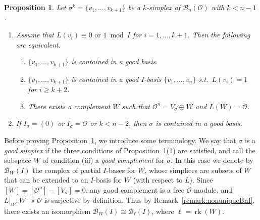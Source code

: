\documentclass[11 pt]{article}
\theoremstyle{plain}
\newtheorem{proposition}[theorem]{Proposition}
\theoremstyle{definition}
\numberwithin{equation}{section}
\renewcommand{\O}{\mathcal{O}}
\newcommand\PartialBases{\ensuremath{\mathcal{B}}}
\newcommand{\PB}{\PartialBases}
\newcommand\onto{\twoheadrightarrow}
\DeclareMathOperator{\Rank}{rk}
\newcommand\iso{\cong}
\newcommand{\change}{}
\begin{document}
\begin{proposition}
\label{prop:charBprime}
Let $\sigma^k=\{v_1,\ldots,v_{k+1}\}$ be a $k$-simplex of $\PB_n(\O)$ \change with $k<n-1$.
\begin{enumerate}[label={\normalfont (\arabic*)},topsep=2pt,itemsep=2pt,parsep=2pt]
\item Assume that \change $L(v_i)\equiv 0\text{ or }1\bmod{I}$ for $i=1,\ldots,k+1$.  Then the following are equivalent.
\begin{enumerate}[label={\normalfont (\roman*)},topsep=1pt,noitemsep]
\item $\{v_1,\ldots,v_{k+1}\}$ is contained in a good basis.
\item $\{v_1,\ldots,v_{k+1}\}$ is contained in a good $I$-basis $\{v_1,\ldots,v_n\}$ s.t.\ $L(v_i)=1$ for $i\geq k+2$.
\item There exists a complement $W$ such that $\O^n=V_\sigma\oplus W$ and $L(W)=\O$.
\end{enumerate}
\item If $I_\sigma=(0)$ or $I_\sigma=\O$ or $k<n-2$, then $\sigma$ is contained in a good basis.
\end{enumerate}
\end{proposition}

Before proving Proposition~\ref{prop:charBprime}, we introduce some terminology.
We say that $\sigma$ is a \emph{good simplex} if the three conditions of Proposition~\ref{prop:charBprime}(1) are satisfied, and call the subspace $W$ of condition (iii) a \emph{good complement} for $\sigma$.
In this case we denote by $\PB_W(I)$ the complex of partial $I$-bases for $W$, whose simplices are subsets of $W$ that can be extended to an $I$-basis for $W$ (with respect to $L$). Since $[W]=[\O^n]-[V_\sigma]=0$, any good complement is a free $\O$-module, and $L|_W\colon W\onto \O$ is surjective by definition. Thus by Remark~\ref{remark:nonuniqueBnI}, there exists an isomorphism $\PB_W(I)\iso \PB_{\ell}(I)$, where $\ell=\Rank(W)$.
\end{document}
